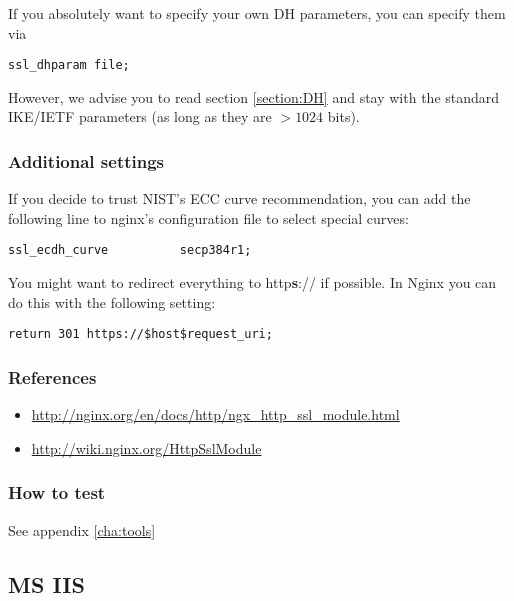 If you absolutely want to specify your own DH parameters, you can specify them via

\begin{lstlisting}[breaklines]
  ssl_dhparam file;
\end{lstlisting}

However, we advise you to read section \ref{section:DH} and stay with the standard IKE/IETF parameters (as long as they are $ > 1024 $ bits).

\subsubsection{Additional settings}

If you decide to trust NIST's ECC curve recommendation, you can add the following line to nginx's configuration file to select special curves:

\begin{lstlisting}[breaklines]
  ssl_ecdh_curve          secp384r1;
\end{lstlisting}

You might want to redirect everything to http\textbf{s}:// if possible. In Nginx you can do this with the following setting:

\begin{lstlisting}[breaklines]
  return 301 https://$host$request_uri;
\end{lstlisting}


\subsubsection{References} 
\begin{itemize}
\item \url{http://nginx.org/en/docs/http/ngx_http_ssl_module.html}
\item \url{http://wiki.nginx.org/HttpSslModule}
\end{itemize}

\subsubsection{How to test}
See appendix \ref{cha:tools}





\subsection{MS IIS}
\label{sec:ms-iis}

